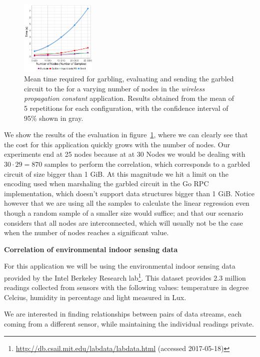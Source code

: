 \begin{figure}
  \includegraphics[width=0.32\textwidth]{plots/turonet.png}
  \caption{Mean time required for garbling, evaluating and sending the garbled
    circuit to the \broker for a varying number of nodes in the \emph{wireless
    propagation constant} application.  Results obtained from the mean of 5
    repetitions for each configuration, with the confidence interval of 95\% shown
    in gray.}
  \label{turonet-times}
\end{figure}

We show the results of the evaluation in figure~\ref{turonet-times}, where we
can clearly see that the cost for this application quickly grows with the
number of nodes.  Our experiments end at 25 nodes because at at 30 Nodes we
would be dealing with $30 \cdot 29 = 870$ samples to perform the correlation,
which corresponds to a garbled circuit of size bigger than 1 GiB.  At this
magnitude we hit a limit on the encoding used when marshaling the garbled
circuit in the Go RPC implementation, which doesn't support data structures
bigger than 1 GiB.  Notice however that we are using all the samples to
calculate the linear regression even though a random sample of a smaller size
would suffice; and that our scenario considers that all nodes are
interconnected, which will usually not be the case when the number of nodes
reaches a significant value.

\bigskip
\noindent\textbf{Correlation of environmental indoor sensing data}

For this application we will be using the environmental indoor sensing data
provided by the Intel Berkeley Research
lab\footnote{\url{http://db.csail.mit.edu/labdata/labdata.html} (accessed
2017-05-18)}.  This dataset provides 2.3 million readings collected
from sensors with the following values: temperature in degree Celcius, humidity
in percentage and light measured in Lux.

We are interested in finding relationships between pairs of data streams, each
coming from a different sensor, while maintaining the individual readings
private.

